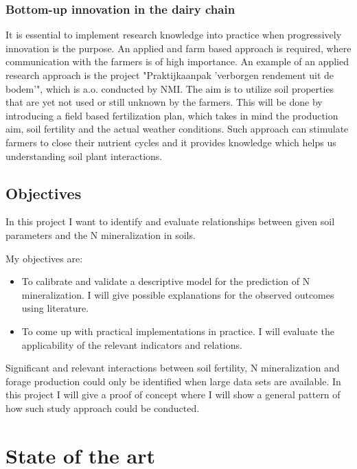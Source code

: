 \documentclass[10pt,twoside,dutch,english]{report}
\begin{document}
		\subsection{Bottom-up innovation in the dairy chain}
		 It is essential to implement research knowledge into practice when progressively innovation is the purpose. An applied and farm based approach is required, where communication with the farmers is of high importance. An example of an applied research approach is the project "Praktijkaanpak 'verborgen rendement uit de bodem'", which is a.o. conducted by NMI. The aim is to utilize soil properties that are yet not used or still unknown by the farmers. This will be done by introducing a field based fertilization plan, which takes in mind the production aim, soil fertility and the actual weather conditions. Such approach can stimulate farmers to close their nutrient cycles and it provides knowledge which helps us understanding soil plant interactions. 
		
	\section{Objectives}
			In this project I want to identify and evaluate relationships between given soil parameters and the N mineralization in soils.
			
			
			My objectives are:
			\begin{itemize}
				\item   To calibrate and validate a descriptive model for the prediction of N mineralization. I will give possible explanations for the observed outcomes using literature.
				\item	To come up with practical implementations in practice. I will evaluate the applicability of the relevant indicators and relations.
				
			\end{itemize}
			
			Significant and relevant interactions between soil fertility, N mineralization and forage production could only be identified when large data sets are available. In this project I will give a proof of concept where I will show a general pattern of how such study approach could be conducted. 
			


\chapter{State of the art} %
	\label{chap: state of the art}
\end{document}
